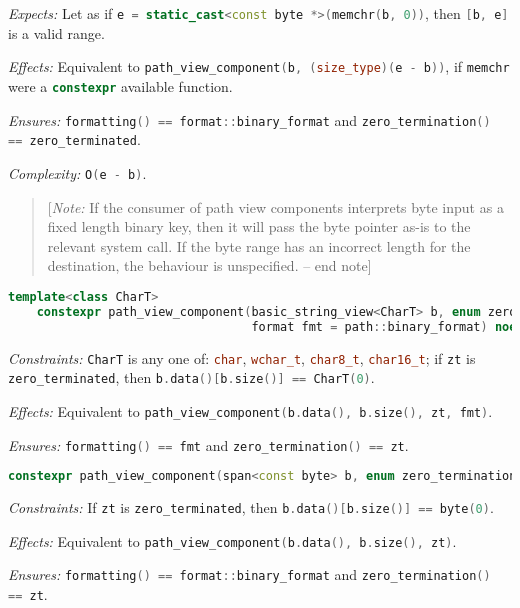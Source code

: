 \documentclass[11pt]{article}
\newcommand{\code}[2][cpp]{\lstinline[language=#1,basicstyle=\small\ttfamily]{#2}}
\newcommand{\desc}[1]{\textit{#1}}
\newcommand{\constraints}{\desc{Constraints: }}
\newcommand{\effects}{\desc{Effects: }}
\newcommand{\expects}{\desc{Expects: }}
\newcommand{\ensures}{\desc{Ensures: }}
\newcommand{\complexity}{\desc{Complexity: }}
\newcommand{\note}[1]{\begin{quote}[\textit{Note:} #1 -- end note]\end{quote}}
\begin{document}
\expects Let as if \code{e = static_cast<const byte *>(memchr(b, 0))}, then \code{[b, e]} is a valid range.

\effects Equivalent to \code{path_view_component(b, (size_type)(e - b))}, if \code{memchr} were a \code{constexpr} available function.

\ensures \code{formatting() == format::binary_format} and \code{zero_termination() == zero_terminated}.

\complexity \code{O(e - b)}.\\

\color{black}

\note{If the consumer of path view components interprets byte input as a fixed length binary key, then it will pass the byte pointer as-is to the relevant system call. If the byte range has an incorrect length for the destination, the behaviour is unspecified.}

\color{darkgreen}

\begin{lstlisting}[language=cpp]
    template<class CharT>
    constexpr path_view_component(basic_string_view<CharT> b, enum zero_termination zt,
                                  format fmt = path::binary_format) noexcept;
\end{lstlisting}
\constraints \code{CharT} is any one of: \code{char}, \code{wchar_t}, \code{char8_t}, \code{char16_t}; if \code{zt} is \code{zero_terminated}, then \code{b.data()[b.size()] == CharT(0)}.

\effects Equivalent to \code{path_view_component(b.data(), b.size(), zt, fmt)}.

\ensures \code{formatting() == fmt} and \code{zero_termination() == zt}.\\

\begin{lstlisting}[language=cpp]
    constexpr path_view_component(span<const byte> b, enum zero_termination zt) noexcept;
\end{lstlisting}
\constraints If \code{zt} is \code{zero_terminated}, then \code{b.data()[b.size()] == byte(0)}.

\effects Equivalent to \code{path_view_component(b.data(), b.size(), zt)}.

\ensures \code{formatting() == format::binary_format} and \code{zero_termination() == zt}.\\
\end{document}
